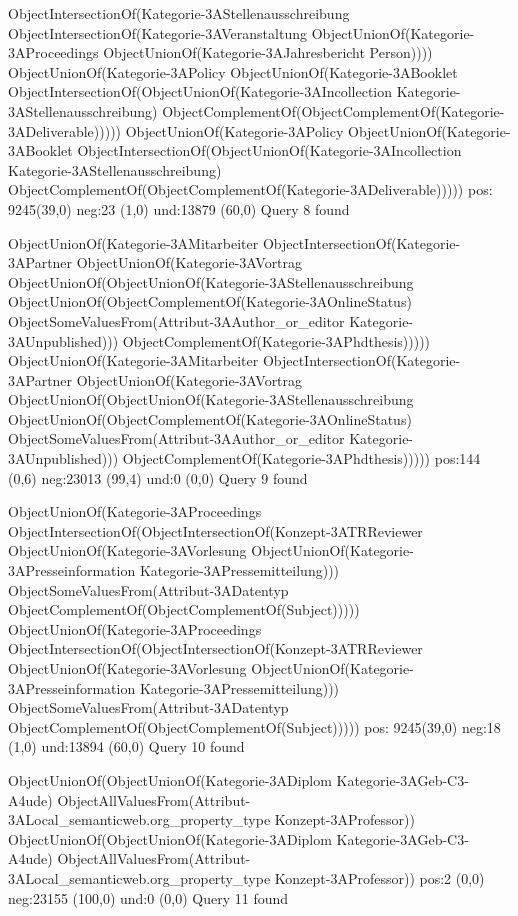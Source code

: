 ObjectIntersectionOf(Kategorie-3AStellenausschreibung ObjectIntersectionOf(Kategorie-3AVeranstaltung ObjectUnionOf(Kategorie-3AProceedings ObjectUnionOf(Kategorie-3AJahresbericht Person))))
ObjectUnionOf(Kategorie-3APolicy ObjectUnionOf(Kategorie-3ABooklet ObjectIntersectionOf(ObjectUnionOf(Kategorie-3AIncollection Kategorie-3AStellenausschreibung) ObjectComplementOf(ObjectComplementOf(Kategorie-3ADeliverable)))))
ObjectUnionOf(Kategorie-3APolicy ObjectUnionOf(Kategorie-3ABooklet ObjectIntersectionOf(ObjectUnionOf(Kategorie-3AIncollection Kategorie-3AStellenausschreibung) ObjectComplementOf(ObjectComplementOf(Kategorie-3ADeliverable)))))
pos: 9245(39,0)		 neg:23 (1,0)		 und:13879 (60,0)
Query 8 found

ObjectUnionOf(Kategorie-3AMitarbeiter ObjectIntersectionOf(Kategorie-3APartner ObjectUnionOf(Kategorie-3AVortrag ObjectUnionOf(ObjectUnionOf(Kategorie-3AStellenausschreibung ObjectUnionOf(ObjectComplementOf(Kategorie-3AOnlineStatus) ObjectSomeValuesFrom(Attribut-3AAuthor_or_editor Kategorie-3AUnpublished))) ObjectComplementOf(Kategorie-3APhdthesis)))))
ObjectUnionOf(Kategorie-3AMitarbeiter ObjectIntersectionOf(Kategorie-3APartner ObjectUnionOf(Kategorie-3AVortrag ObjectUnionOf(ObjectUnionOf(Kategorie-3AStellenausschreibung ObjectUnionOf(ObjectComplementOf(Kategorie-3AOnlineStatus) ObjectSomeValuesFrom(Attribut-3AAuthor_or_editor Kategorie-3AUnpublished))) ObjectComplementOf(Kategorie-3APhdthesis)))))
pos:144 (0,6)		 neg:23013 (99,4)		 und:0 (0,0)
Query 9 found

ObjectUnionOf(Kategorie-3AProceedings ObjectIntersectionOf(ObjectIntersectionOf(Konzept-3ATRReviewer ObjectUnionOf(Kategorie-3AVorlesung ObjectUnionOf(Kategorie-3APresseinformation Kategorie-3APressemitteilung))) ObjectSomeValuesFrom(Attribut-3ADatentyp ObjectComplementOf(ObjectComplementOf(Subject)))))
ObjectUnionOf(Kategorie-3AProceedings ObjectIntersectionOf(ObjectIntersectionOf(Konzept-3ATRReviewer ObjectUnionOf(Kategorie-3AVorlesung ObjectUnionOf(Kategorie-3APresseinformation Kategorie-3APressemitteilung))) ObjectSomeValuesFrom(Attribut-3ADatentyp ObjectComplementOf(ObjectComplementOf(Subject)))))
pos: 9245(39,0)		 neg:18 (1,0)		 und:13894 (60,0)
Query 10 found

ObjectUnionOf(ObjectUnionOf(Kategorie-3ADiplom Kategorie-3AGeb-C3-A4ude) ObjectAllValuesFrom(Attribut-3ALocal_semanticweb.org_property_type Konzept-3AProfessor))
ObjectUnionOf(ObjectUnionOf(Kategorie-3ADiplom Kategorie-3AGeb-C3-A4ude) ObjectAllValuesFrom(Attribut-3ALocal_semanticweb.org_property_type Konzept-3AProfessor))
pos:2 (0,0)		 neg:23155 (100,0)		 und:0 (0,0)
Query 11 found

